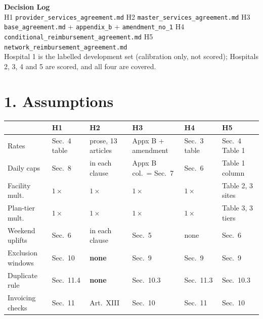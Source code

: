 \documentclass[10pt,a4paper]{article}
\begin{document}
\footnotesize

\begin{center}
{\large\bfseries Decision Log}\\[2pt]
H1 \texttt{provider\_services\_agreement.md} \quad H2 \texttt{master\_services\_agreement.md} \quad
H3 \texttt{base\_agreement.md} + \texttt{appendix\_b} + \texttt{amendment\_no\_1} \quad
H4 \texttt{conditional\_reimbursement\_agreement.md} \quad H5 \texttt{network\_reimbursement\_agreement.md}\\[2pt]
Hospital 1 is the labelled development set (calibration only, not scored); Hospitals 2, 3, 4 and 5 are scored,
and all four are covered.
\end{center}

\vspace{-3pt}
\section*{\normalsize 1.\; Assumptions}
\vspace{-4pt}

\begin{center}
\begin{tabular}{@{}llllll@{}}
\toprule
& \textbf{H1} & \textbf{H2} & \textbf{H3} & \textbf{H4} & \textbf{H5} \\
\midrule
Rates             & Sec.\ 4 table & prose, 13 articles & Appx B + amendment    & Sec.\ 3 table & Sec.\ 4 Table 1 \\
Daily caps        & Sec.\ 8       & in each clause     & Appx B col.\ = Sec.\ 7 & Sec.\ 6      & Table 1 column \\
Facility mult.    & $1\times$     & $1\times$          & $1\times$             & $1\times$     & Table 2, 3 sites \\
Plan-tier mult.   & $1\times$     & $1\times$          & $1\times$             & $1\times$     & Table 3, 3 tiers \\
Weekend uplifts   & Sec.\ 6       & in each clause     & Sec.\ 5               & none          & Sec.\ 6 \\
Exclusion windows & Sec.\ 10      & \textbf{none}      & Sec.\ 9               & Sec.\ 9       & Sec.\ 9 \\
Duplicate rule    & Sec.\ 11.4    & \textbf{none}      & Sec.\ 10.3            & Sec.\ 11.3    & Sec.\ 10.3 \\
Invoicing checks  & Sec.\ 11      & Art.\ XIII         & Sec.\ 10              & Sec.\ 11      & Sec.\ 10 \\
\bottomrule
\end{tabular}
\end{center}
\vspace{-2pt}
\end{document}
